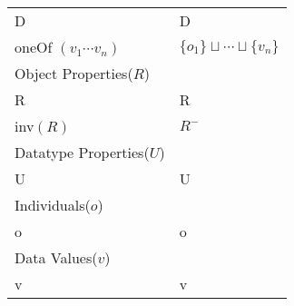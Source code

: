 \begin{table}[h]
\begin{tabular}{|p{10cm}|p{5cm}|}
			\hline
			D & D\\
			oneOf $(v_{1} \cdots v_{n})$ & $\{o_{1}\} \sqcup \cdots \sqcup \{v_{n}\}$\\
			\hline
			Object Properties($R$) & {}\\
			\hline
			R & R\\
			inv$(R)$ & $R^{-}$\\
			\hline
			\hline
			Datatype Properties($U$) & {}\\
			\hline
			U & U\\
			\hline
			\hline
			Individuals($o$) & {}\\
			\hline
			o & o\\
			\hline
			\hline
			Data Values($v$) & {}\\
			\hline
			v & v\\
			\hline
		\end{tabular}
\label{tab:OWLvsDL}
\end{table}

